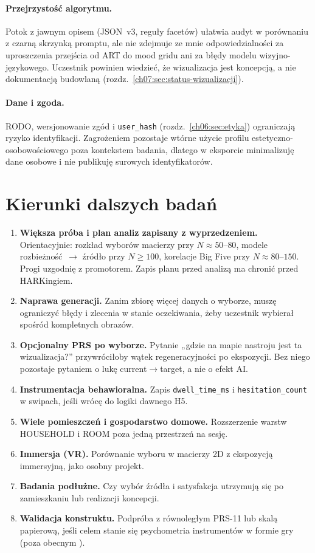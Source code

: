\paragraph{Przejrzystość algorytmu.}
Potok z jawnym opisem (JSON~v3, reguły facetów) ułatwia audyt w porównaniu z czarną skrzynką promptu, ale nie zdejmuje ze mnie odpowiedzialności za uproszczenia przejścia od ART do mood gridu ani za błędy modelu wizyjno-językowego. Uczestnik powinien wiedzieć, że wizualizacja jest koncepcją, a nie dokumentacją budowlaną (rozdz.~\ref{ch07:sec:status-wizualizacji}).

\paragraph{Dane i zgoda.}
RODO, wersjonowanie zgód i \texttt{user\_hash} (rozdz.~\ref{ch06:sec:etyka}) ograniczają ryzyko identyfikacji. Zagrożeniem pozostaje wtórne użycie profilu estetyczno-osobowościowego poza kontekstem badania, dlatego w eksporcie minimalizuję dane osobowe i nie publikuję surowych identyfikatorów.

\section{Kierunki dalszych badań}
\label{ch09:sec:dalsze}

\begin{enumerate}
  \item \textbf{Większa próba i plan analiz zapisany z wyprzedzeniem.} Orientacyjnie: rozkład wyborów macierzy przy $N\!\approx\!50$--$80$, modele rozbieżność~$\rightarrow$ źródło przy $N\!\geq\!100$, korelacje Big Five przy $N\!\approx\!80$--$150$. Progi uzgodnię z promotorem. Zapis planu przed analizą ma chronić przed HARKingiem.
  \item \textbf{Naprawa generacji.} Zanim zbiorę więcej danych o wyborze, muszę ograniczyć błędy i zlecenia w stanie oczekiwania, żeby uczestnik wybierał spośród kompletnych obrazów.
  \item \textbf{Opcjonalny PRS po wyborze.} Pytanie „gdzie na mapie nastroju jest ta wizualizacja?” przywróciłoby wątek regeneracyjności po ekspozycji. Bez niego  pozostaje pytaniem o lukę current$\rightarrow$target, a nie o efekt AI.
  \item \textbf{Instrumentacja behawioralna.} Zapis \texttt{dwell\_time\_ms} i \texttt{hesitation\_count} w swipach, jeśli wrócę do logiki dawnego H5.
  \item \textbf{Wiele pomieszczeń i gospodarstwo domowe.} Rozszerzenie warstw HOUSEHOLD i ROOM poza jedną przestrzeń na sesję.
  \item \textbf{Immersja (VR).} Porównanie wyboru w macierzy 2D z ekspozycją immersyjną, jako osobny projekt.
  \item \textbf{Badania podłużne.} Czy wybór źródła i satysfakcja utrzymują się po zamieszkaniu lub realizacji koncepcji.
  \item \textbf{Walidacja konstruktu.} Podpróba z równoległym PRS-11 lub skalą papierową, jeśli celem stanie się psychometria instrumentów w formie gry (poza obecnym ).
\end{enumerate}
